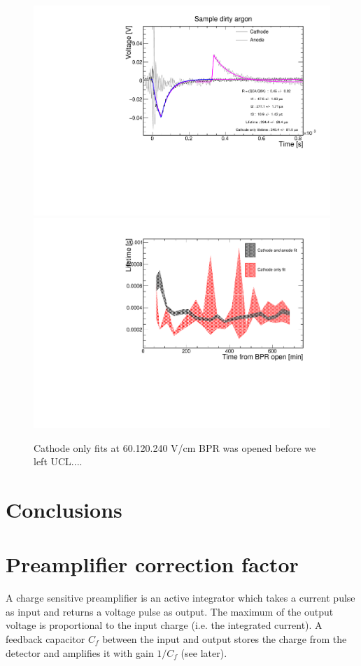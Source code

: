 \documentclass[a4paper,11pt]{article}
\begin{document}
\begin{figure}
    \centering
    \includegraphics[width=.45\linewidth]{figures/ExampleCathodeOnlyFit.pdf}
    \includegraphics[width=.45\linewidth]{figures/CathodeOnlyFit_BPRopen.pdf}
    \caption{Cathode only fits at 60.120.240 V/cm BPR was opened before we left UCL....}
    \label{fig:cathodeOnlyFits}
\end{figure}

\section{Conclusions}

\appendix

\section{Preamplifier correction factor}
\label{app:preamps_correction}
A charge sensitive preamplifier is an active integrator which takes a current pulse as input and returns a voltage pulse as output. The maximum of the output voltage is proportional to the input charge (i.e. the integrated current). A feedback capacitor $C_f$ between the input and output stores the charge from the detector and amplifies it with gain $1/C_f$ (see later). 
\end{document}
